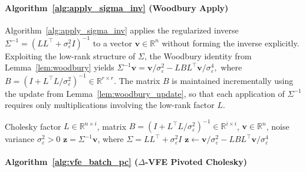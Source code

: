 \documentclass[onefignum,onetabnum]{siamart250211}
\begin{document}
\paragraph{Algorithm~\ref{alg:apply_sigma_inv} (Woodbury Apply)}
Algorithm~\ref{alg:apply_sigma_inv} applies the regularized inverse $\Sigma^{-1} = (LL^\top + \sigma_\varepsilon^2 I)^{-1}$ to a vector $\bm v \in \mathbb R^n$ without forming the inverse explicitly. Exploiting the low-rank structure of $\Sigma$, the Woodbury identity from Lemma~\ref{lem:woodbury} yields
$\Sigma^{-1}\bm v
=
{\bm v}/{\sigma_\varepsilon^{2}}
-
L B L^\top \bm v/\sigma_\varepsilon^4,$
where $B = \left(I + L^\top L/\sigma_\varepsilon^{2}\right)^{-1} \in \mathbb R^{r\times r}.$
The matrix $B$ is maintained incrementally using the update from Lemma~\ref{lem:woodbury_update}, so that each application of $\Sigma^{-1}$ requires only multiplications involving the low-rank factor $L$.
\begin{algorithm}[t]
\caption{\textsc{Woodbury Apply} $\Sigma^{-1}\bm{v}$}
\label{alg:apply_sigma_inv}
\begin{algorithmic}[1]
\REQUIRE Cholesky factor $L\in\mathbb{R}^{n\times i}$, matrix $B=(I+L^\top L/\sigma_\varepsilon^{2})^{-1}\in\mathbb{R}^{i\times i}$, $\bm{v}\in\mathbb{R}^n$, noise variance $\sigma_\varepsilon^2 >0$
\ENSURE $\bm{z}=\Sigma^{-1}\bm{v}$,
  where $\Sigma=LL^\top + \sigma_\varepsilon^2 I $
\RETURN $\bm{z} \leftarrow \bm{v}/\sigma_\varepsilon^{2}
  - LBL^\top\bm{v}/\sigma_\varepsilon^{4}$
\end{algorithmic}
\end{algorithm}


\paragraph{Algorithm~\ref{alg:vfe_batch_pc} ($\Delta$-VFE Pivoted Cholesky)}
\end{document}
